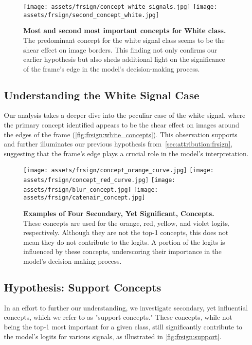 \begin{figure}[ht]
\centering
\texttt{[image: assets/frsign/concept\_white\_signals.jpg]}
\texttt{[image: assets/frsign/second\_concept\_white.jpg]}
\caption{\textbf{Most and second most important concepts for White class.} The predominant concept for the white signal class seems to be the shear effect on image borders. This finding not only confirms our earlier hypothesis but also sheds additional light on the significance of the frame's edge in the model's decision-making process.}
\label{fig:frsign:white_concepts}
\end{figure}

\subsection{Understanding the White Signal Case}

Our analysis takes a deeper dive into the peculiar case of the white signal, where the primary concept identified appears to be the shear effect on images around the edges of the frame (\autoref{fig:frsign:white_concepts}). This observation supports and further illuminates our previous hypothesis from~\autoref{sec:attribution:frsign}, suggesting that the frame's edge plays a crucial role in the model's interpretation.


\begin{figure}[ht]
\centering
\texttt{[image: assets/frsign/concept\_orange\_curve.jpg]}
\texttt{[image: assets/frsign/concept\_red\_curve.jpg]}
\texttt{[image: assets/frsign/blur\_concept.jpg]}
\texttt{[image: assets/frsign/catenair\_concept.jpg]}
\caption{\textbf{Examples of Four Secondary, Yet Significant, Concepts.} These concepts are used for the orange, red, yellow, and violet logits, respectively. Although they are not the top-1 concepts, this does not mean they do not contribute to the logits. A portion of the logits is influenced by these concepts, underscoring their importance in the model's decision-making process.}
\label{fig:frsign:support}
\end{figure}


\subsection{Hypothesis: Support Concepts}

In an effort to further our understanding, we investigate secondary, yet influential concepts, which we refer to as "support concepts." These concepts, while not being the top-1 most important for a given class, still significantly contribute to the model's logits for various signals, as illustrated in \autoref{fig:frsign:support}.

